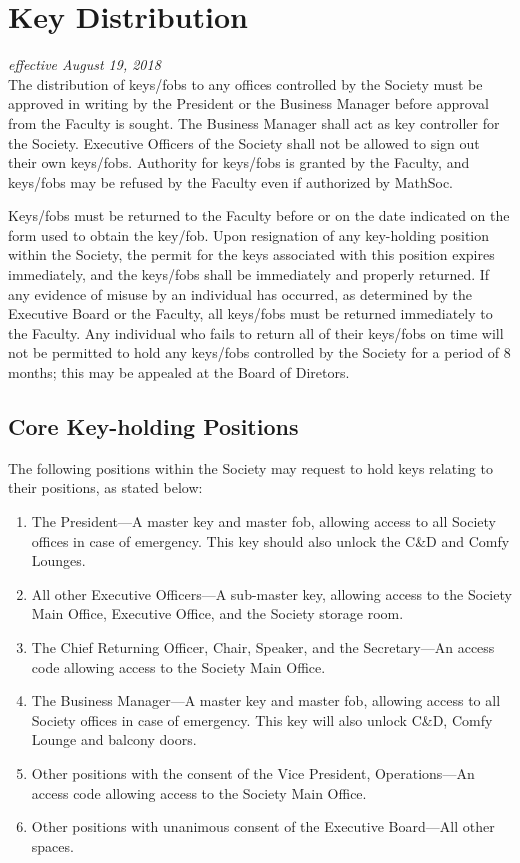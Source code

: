 \section{Key Distribution}
\emph{effective August 19, 2018}\\

The distribution of keys/fobs to any offices controlled by the Society must be
approved in writing by the President or the Business Manager before
approval from the Faculty is sought. The Business Manager shall act
as key controller for the Society. Executive Officers of the Society shall not
be allowed to sign out their own keys/fobs. Authority for keys/fobs is granted
by the Faculty, and keys/fobs may be refused by the Faculty even if authorized
by MathSoc.

Keys/fobs must be returned to the Faculty before or on the date indicated on
the form used to obtain the key/fob. Upon resignation of any key-holding
position within the Society, the permit for the keys associated with this
position expires immediately, and the keys/fobs shall be immediately and
properly returned. If any evidence of misuse by an individual has occurred, as
determined by the Executive Board or the Faculty, all keys/fobs must be
returned immediately to the Faculty. Any individual who fails to return all of
their keys/fobs on time will not be permitted to hold any keys/fobs controlled
by the Society for a period of 8 months; this may be appealed at the Board of 
Diretors.

\subsection{Core Key-holding Positions}
The following positions within the Society may request to hold keys relating to
their positions, as stated below:
\begin{enumerate}
    \item The President---A master key and master fob, allowing access to all
        Society offices in case of emergency. This key should also unlock the C\&D
        and Comfy Lounges.
    \item All other Executive Officers---A sub-master key, allowing access to the
        Society Main Office, Executive Office, and the Society storage room.
    \item The Chief Returning Officer, Chair, Speaker, and the Secretary---An access code
        allowing access to the Society Main Office.
    \item The Business Manager---A master key and master fob, allowing access to all
        Society offices in case of emergency. This key will also unlock C\&D, Comfy Lounge and balcony doors.
    \item Other positions with the consent of the Vice President, Operations---An access code allowing access to the Society Main Office.
    \item Other positions with unanimous consent of the Executive Board---All other spaces.
\end{enumerate}

